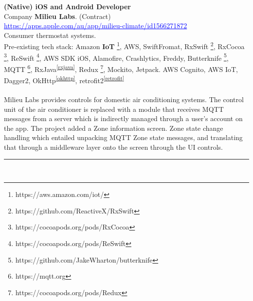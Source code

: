 \documentclass{article}
\let\svthefootnote\thefootnote
\newcommand\Cfootnote[2][black]{\def\thefootnote{\color{#1}\svthefootnote}%
  \footnote{\color{#1}#2}}
\begin{document}
\textbf{ (Native) iOS and Android Developer  }  \\
Company  \textbf {Milieu Labs}. (Contract)  \\
\textcolor{blue} { \underline{  https://apps.apple.com/au/app/milieu-climate/id1566271872   } }  \\


Consumer thermostat systems. \\

Pre-existing tech stack: Amazon \textbf {IoT} \Cfootnote[blue]{https://aws.amazon.com/iot/}, AWS, 
SwiftFromat, RxSwift\Cfootnote[blue]{https://github.com/ReactiveX/RxSwift}, RxCocoa\Cfootnote[blue]{https://cocoapods.org/pods/RxCocoa}, ReSwift\Cfootnote[blue]{https://cocoapods.org/pods/ReSwift},  AWS SDK iOS, Alamofire, Crashlytics, Freddy,
Butterknife\Cfootnote[blue]{https://github.com/JakeWharton/butterknife}, MQTT\Cfootnote[blue]{https://mqtt.org}, RxJava\textsuperscript{\ref{rxjava}}, Redux\Cfootnote[blue]{https://cocoapods.org/pods/Redux}, Mockito, Jetpack. 
AWS Cognito, AWS IoT, Dagger2, OkHttp\textsuperscript{\ref{okhttp}}, retrofit2\textsuperscript{\ref{retrofit}}  \\
\\

Milieu Labs provides controls for domestic air conditioning systems. The control unit of the air conditioner is replaced with a module that receives MQTT messages from a server which is indirectly managed through a user's account on the app. 
The project added a Zone information screen. Zone state change handling which entailed unpacking MQTT Zone state messages, and translating that through a middleware layer onto the screen through the UI controls. \\

\noindent\hfil\rule{0.5\textwidth}{.4pt}\hfil
\\
\end{document}
